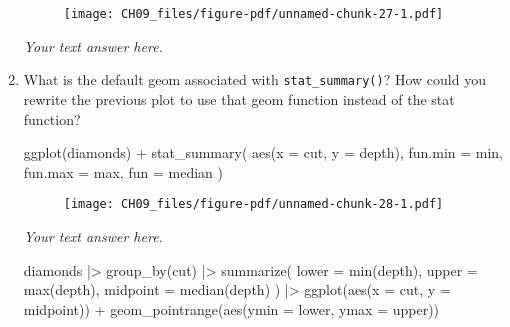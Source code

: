 \documentclass[
  letterpaper,
  DIV=11,
  numbers=noendperiod]{scrreprt}
\newenvironment{Shaded}{\begin{snugshade}}{\end{snugshade}}
\newcommand{\AttributeTok}[1]{\textcolor[rgb]{0.40,0.45,0.13}{#1}}
\newcommand{\FunctionTok}[1]{\textcolor[rgb]{0.28,0.35,0.67}{#1}}
\newcommand{\NormalTok}[1]{\textcolor[rgb]{0.00,0.23,0.31}{#1}}
\newcommand{\SpecialCharTok}[1]{\textcolor[rgb]{0.37,0.37,0.37}{#1}}
\begin{document}
\begin{enumerate}
\begin{tcolorbox}
\begin{figure}[H]
  {\centering \texttt{[image: CH09\_files/figure-pdf/unnamed-chunk-27-1.pdf]}

  }

  \end{figure}

  \emph{Your text answer here.}

  \end{tcolorbox}
\item
  What is the default geom associated with \texttt{stat\_summary()}? How
  could you rewrite the previous plot to use that geom function instead
  of the stat function?

\begin{Shaded}
\begin{Highlighting}[]
\FunctionTok{ggplot}\NormalTok{(diamonds) }\SpecialCharTok{+} 
  \FunctionTok{stat\_summary}\NormalTok{(}
    \FunctionTok{aes}\NormalTok{(}\AttributeTok{x =}\NormalTok{ cut, }\AttributeTok{y =}\NormalTok{ depth),}
    \AttributeTok{fun.min =}\NormalTok{ min,}
    \AttributeTok{fun.max =}\NormalTok{ max,}
    \AttributeTok{fun =}\NormalTok{ median}
\NormalTok{  )}
\end{Highlighting}
\end{Shaded}

  \begin{figure}[H]

  {\centering \texttt{[image: CH09\_files/figure-pdf/unnamed-chunk-28-1.pdf]}

  }

  \end{figure}

  \begin{tcolorbox}[enhanced jigsaw, breakable, bottomtitle=1mm, left=2mm, colback=white, toprule=.15mm, leftrule=.75mm, colframe=quarto-callout-note-color-frame, colbacktitle=quarto-callout-note-color!10!white, title={Answer}, coltitle=black, toptitle=1mm, bottomrule=.15mm, opacitybacktitle=0.6, arc=.35mm, rightrule=.15mm, titlerule=0mm, opacityback=0]

  \emph{Your text answer here.}

\begin{Shaded}
\begin{Highlighting}[]
\NormalTok{diamonds }\SpecialCharTok{|\textgreater{}}
  \FunctionTok{group\_by}\NormalTok{(cut) }\SpecialCharTok{|\textgreater{}}
  \FunctionTok{summarize}\NormalTok{(}
    \AttributeTok{lower =} \FunctionTok{min}\NormalTok{(depth),}
    \AttributeTok{upper =} \FunctionTok{max}\NormalTok{(depth),}
    \AttributeTok{midpoint =} \FunctionTok{median}\NormalTok{(depth)}
\NormalTok{  ) }\SpecialCharTok{|\textgreater{}}
  \FunctionTok{ggplot}\NormalTok{(}\FunctionTok{aes}\NormalTok{(}\AttributeTok{x =}\NormalTok{ cut, }\AttributeTok{y =}\NormalTok{ midpoint)) }\SpecialCharTok{+}
  \FunctionTok{geom\_pointrange}\NormalTok{(}\FunctionTok{aes}\NormalTok{(}\AttributeTok{ymin =}\NormalTok{ lower, }\AttributeTok{ymax =}\NormalTok{ upper))}
\end{Highlighting}
\end{Shaded}


\end{tcolorbox}
\end{enumerate}
\end{document}
